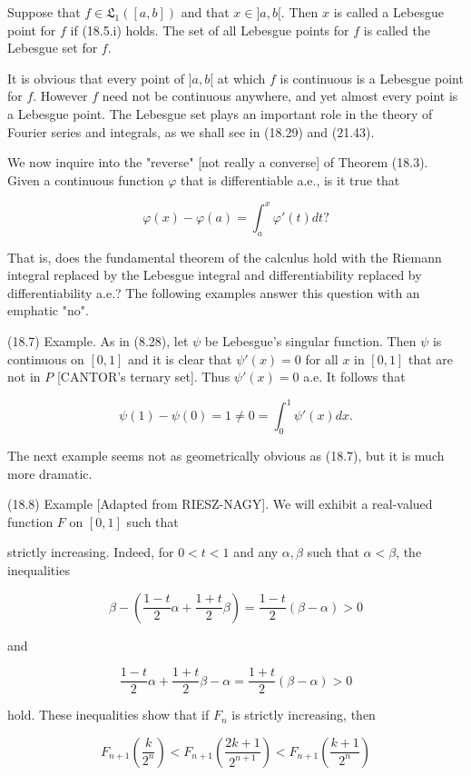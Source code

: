 Suppose that $f \in \mathfrak{L}_1([a, b])$ and that $x \in ]a, b[$. Then $x$ is called a Lebesgue point for $f$ if (18.5.i) holds. The set of all Lebesgue points for $f$ is called the Lebesgue set for $f$.

It is obvious that every point of $]a, b[$ at which $f$ is continuous is a Lebesgue point for $f$. However $f$ need not be continuous anywhere, and yet almost every point is a Lebesgue point. The Lebesgue set plays an important role in the theory of Fourier series and integrals, as we shall see in (18.29) and (21.43).

We now inquire into the "reverse" [not really a converse] of Theorem (18.3). Given a continuous function $\varphi$ that is differentiable a.e., is it true that

$$\varphi(x) - \varphi(a) = \int_a^x \varphi'(t) dt?$$

That is, does the fundamental theorem of the calculus hold with the Riemann integral replaced by the Lebesgue integral and differentiability replaced by differentiability a.e.? The following examples answer this question with an emphatic "no".

(18.7) Example. As in (8.28), let $\psi$ be Lebesgue's singular function. Then $\psi$ is continuous on $[0, 1]$ and it is clear that $\psi'(x) = 0$ for all $x$ in $[0, 1]$ that are not in $P$ [CANTOR's ternary set]. Thus $\psi'(x) = 0$ a.e. It follows that

$$\psi(1) - \psi(0) = 1 \neq 0 = \int_0^1 \psi'(x) dx.$$

The next example seems not as geometrically obvious as (18.7), but it is much more dramatic.

(18.8) Example [Adapted from RIESZ-NAGY]. We will exhibit a real-valued function $F$ on $[0, 1]$ such that

strictly increasing. Indeed, for $0 < t < 1$ and any $\alpha, \beta$ such that $\alpha < \beta$, the inequalities

$$\beta - \left( \frac{1 - t}{2} \alpha + \frac{1 + t}{2} \beta \right) = \frac{1 - t}{2} (\beta - \alpha) > 0$$

and

$$\frac{1 - t}{2} \alpha + \frac{1 + t}{2} \beta - \alpha = \frac{1 + t}{2} (\beta - \alpha) > 0$$

hold. These inequalities show that if $F_n$ is strictly increasing, then

$$F_{n+1} \left( \frac{k}{2^n} \right) < F_{n+1} \left( \frac{2k+1}{2^{n+1}} \right) < F_{n+1} \left( \frac{k+1}{2^n} \right)$$

